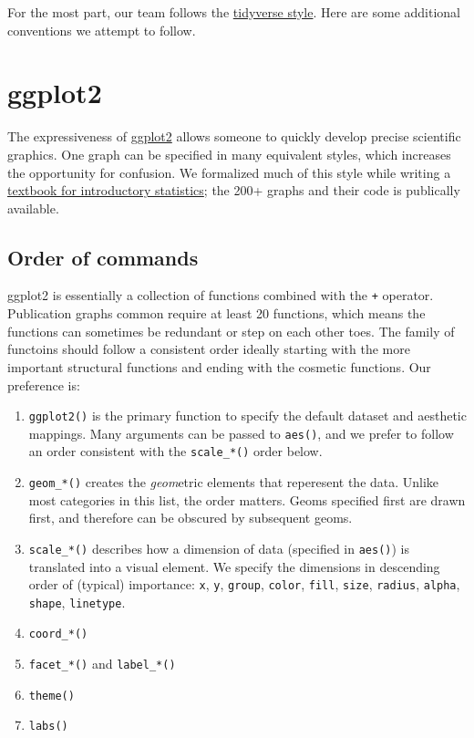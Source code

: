 \documentclass[]{book}
\providecommand{\tightlist}{%
  \setlength{\itemsep}{0pt}\setlength{\parskip}{0pt}}
\begin{document}
For the most part, our team follows the \href{http://adv-r.had.co.nz/Style.html}{tidyverse style}. Here are some additional conventions we attempt to follow.

\hypertarget{ggplot2}{%
\section{ggplot2}\label{ggplot2}}

The expressiveness of \href{https://ggplot2.tidyverse.org/}{ggplot2} allows someone to quickly develop precise scientific graphics. One graph can be specified in many equivalent styles, which increases the opportunity for confusion. We formalized much of this style while writing a \href{https://github.com/OuhscBbmc/DeSheaToothakerIntroStats/blob/master/thumbnails/thumbnails.md}{textbook for introductory statistics}; the 200+ graphs and their code is publically available.

\hypertarget{order-of-commands}{%
\subsection{Order of commands}\label{order-of-commands}}

ggplot2 is essentially a collection of functions combined with the \texttt{+} operator. Publication graphs common require at least 20 functions, which means the functions can sometimes be redundant or step on each other toes. The family of functoins should follow a consistent order ideally starting with the more important structural functions and ending with the cosmetic functions. Our preference is:

\begin{enumerate}
\def\labelenumi{\arabic{enumi}.}
\tightlist
\item
  \texttt{ggplot2()} is the primary function to specify the default dataset and aesthetic mappings. Many arguments can be passed to \texttt{aes()}, and we prefer to follow an order consistent with the \texttt{scale\_*()} order below.
\item
  \texttt{geom\_*()} creates the \emph{geom}etric elements that reperesent the data. Unlike most categories in this list, the order matters. Geoms specified first are drawn first, and therefore can be obscured by subsequent geoms.
\item
  \texttt{scale\_*()} describes how a dimension of data (specified in \texttt{aes()}) is translated into a visual element. We specify the dimensions in descending order of (typical) importance: \texttt{x}, \texttt{y}, \texttt{group}, \texttt{color}, \texttt{fill}, \texttt{size}, \texttt{radius}, \texttt{alpha}, \texttt{shape}, \texttt{linetype}.
\item
  \texttt{coord\_*()}
\item
  \texttt{facet\_*()} and \texttt{label\_*()}
\item
  \texttt{theme()}
\item
  \texttt{labs()}
\end{enumerate}
\end{document}
